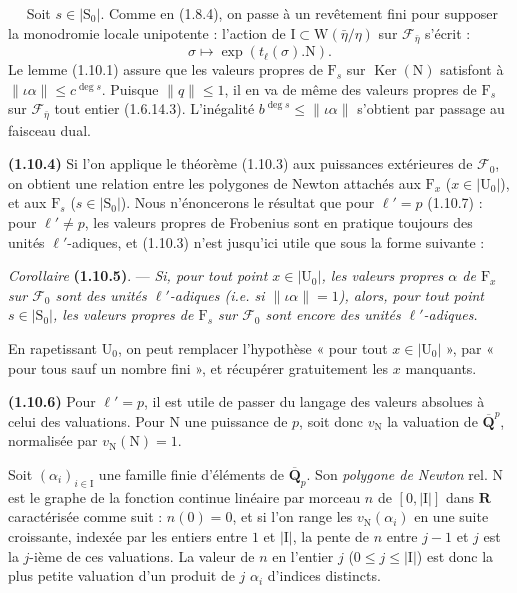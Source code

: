 \documentclass[11pt,leqno]{article}
\newcommand{\Page}[1]{\ifvmode\noindent\else\unskip\ \fi{\footnotesize\textcolor{gray}{[p.\,#1]}}\ \ignorespaces}
\begin{document}
\Page{183}
Soit \(s\in\lvert\mathrm{S}_0\rvert\). Comme en (1.8.4), on passe à un revêtement fini pour supposer la monodromie locale unipotente : l’action de \(\mathrm{I}\subset\mathrm{W}(\bar{\eta}/\eta)\) sur \(\mathscr{F}_{\bar{\eta}}\) s’écrit :
\[
\sigma\mapsto\exp(t_\ell(\sigma).\mathrm{N}).
\]
Le lemme (1.10.1) assure que les valeurs propres de \(\mathrm{F}_s\) sur \(\operatorname{Ker}(\mathrm{N})\) satisfont à \(\lVert\iota\alpha\rVert\leq c^{\deg s}\). Puisque \(\lVert q\rVert\leq1\), il en va de même des valeurs propres de \(\mathrm{F}_s\) sur \(\mathscr{F}_{\bar{\eta}}\) tout entier (1.6.14.3). L’inégalité \(b^{\deg s}\leq\lVert\iota\alpha\rVert\) s’obtient par passage au faisceau dual.

\textbf{(1.10.4)} Si l’on applique le théorème (1.10.3) aux puissances extérieures de \(\mathscr{F}_0\), on obtient une relation entre les polygones de Newton attachés aux \(\mathrm{F}_x\) (\(x\in\lvert\mathrm{U}_0\rvert\)), et aux \(\mathrm{F}_s\) (\(s\in\lvert\mathrm{S}_0\rvert\)). Nous n’énoncerons le résultat que pour \(\ell'=p\) (1.10.7) : pour \(\ell'\neq p\), les valeurs propres de Frobenius sont en pratique toujours des unités \(\ell'\)-adiques, et (1.10.3) n’est jusqu’ici utile que sous la forme suivante :

\textit{Corollaire} \textbf{(1.10.5)}. — \textit{Si, pour tout point \(x\in\lvert\mathrm{U}_0\rvert\), les valeurs propres \(\alpha\) de \(\mathrm{F}_x\) sur \(\mathscr{F}_0\) sont des unités \(\ell'\)-adiques (\textup{i.e.} si \(\lVert\iota\alpha\rVert=1\)), alors, pour tout point \(s\in\lvert\mathrm{S}_0\rvert\), les valeurs propres de \(\mathrm{F}_s\) sur \(\mathscr{F}_0\) sont encore des unités \(\ell'\)-adiques.}

En rapetissant \(\mathrm{U}_0\), on peut remplacer l’hypothèse « pour tout \(x\in\lvert\mathrm{U}_0\rvert\) », par « pour tous sauf un nombre fini », et récupérer gratuitement les \(x\) manquants.

\textbf{(1.10.6)} Pour \(\ell'=p\), il est utile de passer du langage des valeurs absolues à celui des valuations. Pour \(\mathrm{N}\) une puissance de \(p\), soit donc \(v_{\mathrm{N}}\) la valuation de \(\overline{\mathbf{Q}}^{p}\), normalisée par \(v_{\mathrm{N}}(\mathrm{N})=1\).

Soit \((\alpha_i)_{i\in\mathrm{I}}\) une famille finie d’éléments de \(\overline{\mathbf{Q}}_p\). Son \textit{polygone de Newton} rel. \(\mathrm{N}\) est le graphe de la fonction continue linéaire par morceau \(n\) de \([0,\lvert\mathrm{I}\rvert]\) dans \(\mathbf{R}\) caractérisée comme suit : \(n(0)=0\), et si l’on range les \(v_{\mathrm{N}}(\alpha_i)\) en une suite croissante, indexée par les entiers entre \(1\) et \(\lvert\mathrm{I}\rvert\), la pente de \(n\) entre \(j-1\) et \(j\) est la \(j\)-ième de ces valuations. La valeur de \(n\) en l’entier \(j\) (\(0\leq j\leq\lvert\mathrm{I}\rvert\)) est donc la plus petite valuation d’un produit de \(j\) \(\alpha_i\) d’indices distincts.
\end{document}
